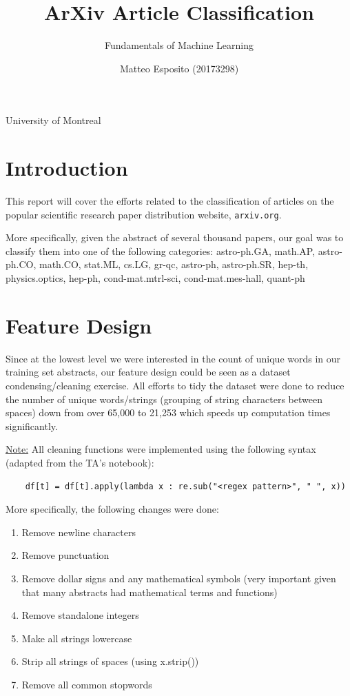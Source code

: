 \documentclass[a4paper,12pt]{article}
\title{\textbf{ArXiv Article Classification}}
\author{Fundamentals of Machine Learning}
\date{Matteo Esposito (20173298)}
\def\code#1{\texttt{#1}}
\begin{document}
\begin{titlingpage}
  \maketitle
  \centering
  \vfill
  {\large{University of Montreal}}\par
  {\large{}}
\end{titlingpage}

\newpage

\section{Introduction}

This report will cover the efforts related to the classification of articles on the popular scientific research paper distribution website, \code{arxiv.org}. 

\medskip

More specifically, given the abstract of several thousand papers, our goal was to classify them into one of the following categories: astro-ph.GA, math.AP, astro-ph.CO, math.CO, stat.ML, cs.LG, gr-qc, astro-ph, astro-ph.SR, hep-th, physics.optics, hep-ph, cond-mat.mtrl-sci, cond-mat.mes-hall, quant-ph

\section{Feature Design}

Since at the lowest level we were interested in the count of unique words in our training set abstracts, our feature design could be seen as a dataset condensing/cleaning exercise. All efforts to tidy the dataset were done to reduce the number of unique words/strings (grouping of string characters between spaces) down from over 65,000 to 21,253 which speeds up computation times significantly. 

\medskip

\underline{Note:} All cleaning functions were implemented using the following syntax (adapted from the TA's notebook): 

\begin{verbatim}
    df[t] = df[t].apply(lambda x : re.sub("<regex pattern>", " ", x))
\end{verbatim}

More specifically, the following changes were done:

\begin{enumerate}
    \item Remove newline characters
    \item Remove punctuation
    \item Remove dollar signs and any mathematical symbols (very important given that many abstracts had mathematical terms and functions)
    \item Remove standalone integers 
    \item Make all strings lowercase
    \item Strip all strings of spaces (using x.strip())
    \item Remove all common stopwords
\end{enumerate}
\end{document}
